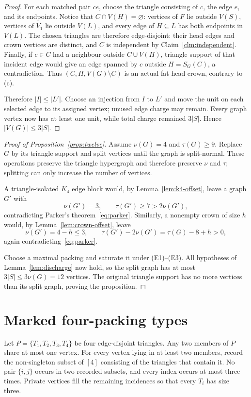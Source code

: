 \documentclass[11pt]{article}
\theoremstyle{definition}
\begin{document}
\begin{proof}
For each matched pair $ce$, choose the triangle consisting of $c$, the edge
$e$, and its endpoints.  Notice that $C\cap V(H)=\varnothing$: vertices of
$F$ lie outside $V(S)$, vertices of $V_1$ lie outside $V(L)$, and every edge
of $H\subseteq L$ has both endpoints in $V(L)$.  The chosen triangles are
therefore edge-disjoint: their head edges and crown vertices are distinct,
and $C$ is independent by Claim~\ref{clm:independent}.  Finally, if $c\in C$
had a neighbour outside
$C\cup V(H)$, triangle support of that incident edge would give an edge
spanned by $c$ outside $H=S_G(C)$, a contradiction.  Thus
$(C,H,V(G)\setminus C)$ is an actual fat-head crown, contrary to (c).

Therefore $|I|\leq |L'|$.  Choose an injection from $I$ to $L'$ and move the
unit on each selected edge to its assigned vertex; unused edge charge may
remain.  Every graph vertex now has at least one unit, while total charge
remained $3|S|$.  Hence $|V(G)|\leq3|S|$.
\end{proof}

\begin{proof}[Proof of Proposition~\ref{prop:twelve}]
Assume $\nu(G)=4$ and $\tau(G)\geq9$.  Replace $G$ by its triangle support
and split vertices until the graph is split-normal.  These operations preserve
the triangle hypergraph and therefore preserve $\nu$ and $\tau$; splitting can
only increase the number of vertices.

A triangle-isolated $K_4$ edge block would, by
Lemma~\ref{lem:k4-offset}, leave a graph $G'$ with
\[
  \nu(G')=3,
  \qquad
  \tau(G')\geq7>2\nu(G'),
\]
contradicting Parker's theorem~\eqref{eq:parker}.  Similarly, a nonempty crown
of size $h$ would, by Lemma~\ref{lem:crown-offset}, leave
\[
  \nu(G')=4-h\leq3,
  \qquad
  \tau(G')-2\nu(G')
    =\tau(G)-8+h>0,
\]
again contradicting~\eqref{eq:parker}.

Choose a maximal packing and saturate it under (E1)--(E3).  All hypotheses of
Lemma~\ref{lem:discharge} now hold, so the split graph has at most
$3|S|\leq3\nu(G)=12$ vertices.  The original triangle support has no more
vertices than its split graph, proving the proposition.
\end{proof}

\section{Marked four-packing types}\label{sec:types}

Let $P=\{T_1,T_2,T_3,T_4\}$ be four edge-disjoint triangles.  Any two members
of $P$ share at most one vertex.  For every vertex lying in at least two
members, record the non-singleton subset of $[4]$ consisting of the triangles
that contain it.  No pair $\{i,j\}$ occurs in two recorded subsets, and every
index occurs at most three times.  Private vertices fill the remaining
incidences so that every $T_i$ has size three.
\end{document}
